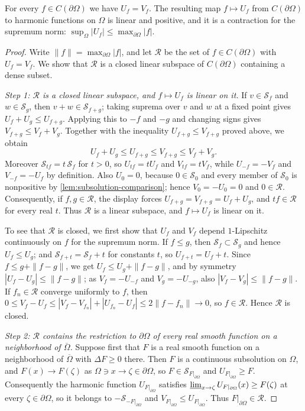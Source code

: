 \begin{theorem}\label{thm:perron-resolutivity}
For every $f\in C(\partial\Omega)$ we have $U_f=V_f$. The resulting map $f\mapsto U_f$ from $C(\partial\Omega)$ to harmonic functions on $\Omega$ is linear and positive, and it is a contraction for the supremum norm: $\sup_\Omega|U_f|\leq\max_{\partial\Omega}|f|$.
\end{theorem}
\begin{proof}
Write $\|f\|=\max_{\partial\Omega}|f|$, and let $\mathcal R$ be the set of $f\in C(\partial\Omega)$ with $U_f=V_f$. We show that $\mathcal R$ is a closed linear subspace of $C(\partial\Omega)$ containing a dense subset.

\emph{Step 1: $\mathcal R$ is a closed linear subspace, and $f\mapsto U_f$ is linear on it.} If $v\in\mathcal S_f$ and $w\in\mathcal S_g$, then $v+w\in\mathcal S_{f+g}$; taking suprema over $v$ and $w$ at a fixed point gives $U_f+U_g\leq U_{f+g}$. Applying this to $-f$ and $-g$ and changing signs gives $V_{f+g}\leq V_f+V_g$. Together with the inequality $U_{f+g}\leq V_{f+g}$ proved above, we obtain
\[
 U_f+U_g\leq U_{f+g}\leq V_{f+g}\leq V_f+V_g.
\]
Moreover $\mathcal S_{tf}=t\,\mathcal S_f$ for $t>0$, so $U_{tf}=tU_f$ and $V_{tf}=tV_f$, while $U_{-f}=-V_f$ and $V_{-f}=-U_f$ by definition. Also $U_0=0$, because $0\in\mathcal S_0$ and every member of $\mathcal S_0$ is nonpositive by \cref{lem:subsolution-comparison}; hence $V_0=-U_0=0$ and $0\in\mathcal R$. Consequently, if $f,g\in\mathcal R$, the display forces $U_{f+g}=V_{f+g}=U_f+U_g$, and $tf\in\mathcal R$ for every real $t$. Thus $\mathcal R$ is a linear subspace, and $f\mapsto U_f$ is linear on it.

To see that $\mathcal R$ is closed, we first show that $U_f$ and $V_f$ depend $1$-Lipschitz continuously on $f$ for the supremum norm. If $f\leq g$, then $\mathcal S_f\subset\mathcal S_g$ and hence $U_f\leq U_g$; and $\mathcal S_{f+t}=\mathcal S_f+t$ for constants $t$, so $U_{f+t}=U_f+t$. Since $f\leq g+\|f-g\|$, we get $U_f\leq U_g+\|f-g\|$, and by symmetry $|U_f-U_g|\leq\|f-g\|$; as $V_f=-U_{-f}$ and $V_g=-U_{-g}$, also $|V_f-V_g|\leq\|f-g\|$. If $f_n\in\mathcal R$ converge uniformly to $f$, then $0\leq V_f-U_f\leq|V_f-V_{f_n}|+|U_{f_n}-U_f|\leq2\|f-f_n\|\to0$, so $f\in\mathcal R$. Hence $\mathcal R$ is closed.

\emph{Step 2: $\mathcal R$ contains the restriction to $\partial\Omega$ of every real smooth function on a neighborhood of $\overline\Omega$.} Suppose first that $F$ is a real smooth function on a neighborhood of $\overline\Omega$ with $\Delta F\geq0$ there. Then $F$ is a continuous subsolution on $\Omega$, and $F(x)\to F(\zeta)$ as $\Omega\ni x\to\zeta\in\partial\Omega$, so $F\in\mathcal S_{F|_{\partial\Omega}}$ and $U_{F|_{\partial\Omega}}\geq F$. Consequently the harmonic function $U_{F|_{\partial\Omega}}$ satisfies $\varliminf_{x\to\zeta}U_{F|_{\partial\Omega}}(x)\geq F(\zeta)$ at every $\zeta\in\partial\Omega$, so it belongs to $-\mathcal S_{-F|_{\partial\Omega}}$ and $V_{F|_{\partial\Omega}}\leq U_{F|_{\partial\Omega}}$. Thus $F|_{\partial\Omega}\in\mathcal R$.


\end{proof}

